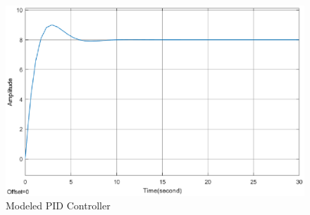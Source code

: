 \begin{figure}[H]
	\centering
	\includegraphics[width=1\textwidth]{figures/06ModelValidation/modelPID.eps}
	\caption{Modeled PID Controller}
\end{figure}